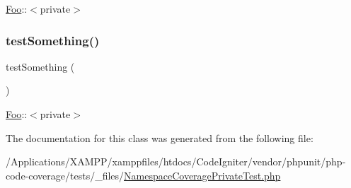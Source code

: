 \mbox{\hyperlink{class_foo}{Foo}}\+:\+:$<$private$>$ \mbox{\label{class_namespace_coverage_private_test_a0fc4e17369bc9607ebdd850d9eda8167}} 
\subsubsection{\texorpdfstring{test\+Something()}{testSomething()}\hspace{0.1cm}{\footnotesize\ttfamily [2/2]}}
{\footnotesize\ttfamily test\+Something (\begin{DoxyParamCaption}{ }\end{DoxyParamCaption})}

\mbox{\hyperlink{class_foo}{Foo}}\+:\+:$<$private$>$ 

The documentation for this class was generated from the following file\+:\begin{DoxyCompactItemize}
\item 
/\+Applications/\+X\+A\+M\+P\+P/xamppfiles/htdocs/\+Code\+Igniter/vendor/phpunit/php-\/code-\/coverage/tests/\+\_\+files/\mbox{\hyperlink{php-code-coverage_2tests_2__files_2_namespace_coverage_private_test_8php}{Namespace\+Coverage\+Private\+Test.\+php}}\end{DoxyCompactItemize}
